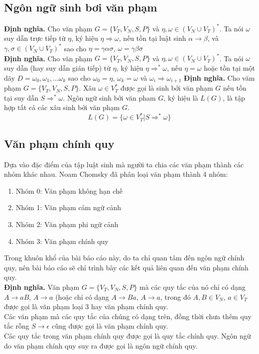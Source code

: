 \documentclass[14pt]{extreport}
\begin{document}
\subsection{Ngôn ngữ sinh bơi văn phạm}
\textbf{Định nghĩa.} Cho văn phạm $G = \{ V_T, V_N, S, P \}$ và $\eta , \omega \in (V_N \cup V_T)^*$. Ta nói $\omega$ suy dẫn trực tiếp từ $\eta$, ký hiệu $\eta \Rightarrow \omega$, nếu tồn tại luật sinh $\alpha \rightarrow \beta$, và $\gamma , \sigma \in (V_N \cup V_T)^*$ sao cho $\eta = \gamma \alpha \sigma$, $\omega = \gamma \beta \sigma$ \\
\textbf{Định nghĩa.} Cho văn phạm $G = \{ V_T, V_N, S, P \}$ và $\eta , \omega \in (V_N \cup V_T)^*$. Ta nói $\omega$ suy dẫn (hay suy dẫn gián tiếp) từ $\eta$, ký hiệu $\eta \Rightarrow^* \omega$, nếu $\eta = \omega$ hoặc tồn tại một dãy $D = \omega_0 , \omega_1 , ... \omega_k$ sao cho $\omega_0 = \eta$, $\omega_k = \omega$ và $\omega_i \Rightarrow \omega_{i+1}$
\textbf{Định nghĩa.} Cho văm phạm  $G = \{ V_T, V_N, S, P \}$. Xâu $\omega \in V_T^*$ được gọi là sinh bởi văn phạm $G$ nếu tồn tại suy dẫn $S \Rightarrow^* \omega$. Ngôn ngữ sinh bởi văn pham $G$, ký hiệu là $L(G)$, là tập hợp tất cả các xâu sinh bởi văn phạm $G$.
$$L(G) = \{ \omega \in V_T^* | S \Rightarrow^* \omega \}$$

\subsection{Văn phạm chính quy}
Dựa vào đặc điểm của tập luật sinh mà người ta chia các văn phạm thành các nhóm khác nhau. Noam Chomsky đã phân loại văn phạm thành 4 nhóm:
\begin{enumerate}
\item Nhóm 0: Văn phạm không hạn chế
\item Nhóm 1: Văn phạm cảm ngữ cảnh
\item Nhóm 2: Văn phạm phi ngữ cảnh
\item Nhóm 3: Văn phạm chính quy
\end{enumerate}

Trong khuôn khổ của bài báo cáo này, do ta chỉ quan tâm đến ngôn ngữ chính quy, nên bài báo cáo sẽ chỉ trình bày các kết quả liên quan đến văn phạm  chính quy.\\
\textbf{Định nghĩa.} Văn phạm $G = \{ V_T, V_N, S, P \}$ mà các quy tắc của nó chỉ có dạng $A \rightarrow aB$, $A \rightarrow a$ (hoặc chỉ có dạng $A \rightarrow Ba$, $A \rightarrow a$, trong đó $A, B \in V_N$, $a \in V_T$ được gọi là văn phạm loại 3 hay văn phạm chính quy.\\
Các văn phạm mà các quy tắc của chúng có dạng trên, đồng thời chưa thêm quy tắc rỗng $S \rightarrow \epsilon$ cũng được gọi là văn phạm chính quy.\\
Các quy tắc trong văn phạm chính quy được gọi là quy tắc chính quy. Ngôn ngữ do văn phạm chính quy suy ra được gọi là ngôn ngữ chính quy.
\end{document}
